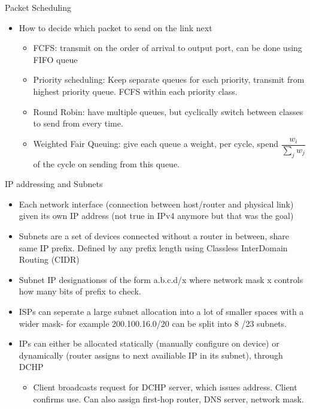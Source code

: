 \documentclass{beamer}
\begin{document}
\begin{frame}[t]{Packet Scheduling}
    \begin{itemize}
        \item How to decide which packet to send on the link next
        \begin{itemize}
            \pause\item \alert{FCFS}: transmit on the order of arrival to output port, can be done using FIFO queue
            \pause\item \alert{Priority scheduling}: Keep separate queues for each priority, transmit from highest priority queue. FCFS within each priority class.
            \pause\item \alert{Round Robin}: have multiple queues, but cyclically switch between classes to send from every time.
            \pause\item \alert{Weighted Fair Queuing}: give each queue a weight, per cycle, spend $\dfrac{w_i}{\sum\limits_j w_j}$ of the cycle on sending from this queue.
        \end{itemize}
    \end{itemize}
\end{frame}


\begin{frame}[t]{IP addressing and Subnets}
    \begin{itemize}
        \item Each network interface (connection between host/router and physical link) given its own IP address (not true in IPv4 anymore but that was the goal)
        \pause\item \alert{Subnets} are a set of devices connected without a router in between, share same IP prefix. Defined by any prefix length using \alert{Classless InterDomain Routing} (CIDR)
        \pause\item Subnet IP designationss of the form a.b.c.d/x where network mask x controls how many bits of prefix to check.
        \pause\item ISPs can seperate a large subnet allocation into a lot of smaller spaces with a wider mask- for example 200.100.16.0/20 can be split into 8 /23 subnets.
        \pause\item IPs can either be allocated \alert{statically} (manually configure on device) or \alert{dynamically} (router assigns to next availiable IP in its subnet), through DCHP
        \begin{itemize}
            \pause\item Client broadcasts request for DCHP server, which issues address. Client confirms use. Can also assign first-hop router, DNS server, network mask.
        \end{itemize}
    \end{itemize}
\end{frame}
\end{document}
